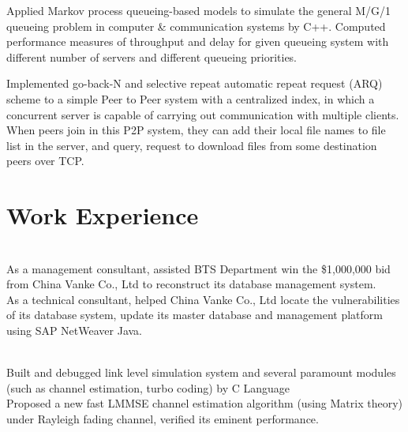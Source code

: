 \documentclass[]{Hsb_resume}
\begin{document}
\begin{minipage}[t]{0.66\textwidth}
\textbullet{ }  Applied Markov process queueing-based models to simulate the general M/G/1 queueing problem in computer \& communication systems by C++. Computed performance measures of throughput and delay for given queueing system with different number of servers and different queueing priorities.
\sectionsep

\textbullet{ }  Implemented go-back-N and selective repeat automatic repeat request (ARQ) scheme to a simple Peer to Peer system with a centralized index, in which a concurrent server is capable of carrying out communication with multiple clients. When peers join in this P2P system, they can add their local file names to file list in the server, and query, request to download files from some destination peers over TCP.
\sectionsep


\vspace{-4pt}
\section{Work Experience}
\\
\textbullet{ } As a management consultant, assisted BTS Department win the \$1,000,000 bid from China Vanke Co., Ltd to reconstruct its database management system. \\
\textbullet{ } As a technical consultant, helped China Vanke Co., Ltd locate the vulnerabilities of its database system, update its master database and management platform using SAP NetWeaver Java.\\
\sectionsep

\\
\textbullet{ } Built and debugged link level simulation system and several paramount modules  (such as channel estimation, turbo coding) by C Language \\
\textbullet{ } Proposed a new fast LMMSE channel estimation algorithm (using Matrix theory) under Rayleigh fading channel, verified its eminent performance.\\
\sectionsep


\end{minipage}
\end{document}
